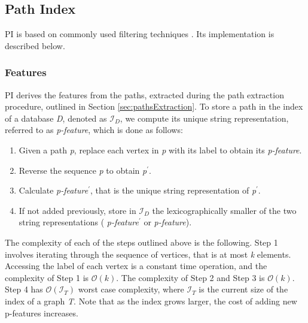 \documentclass{l4proj}
\newcommand{\fancyI}{\mathcal{I}}
\begin{document}
\subsection{Path Index}
\label{sec:pi}
PI is based on commonly used filtering techniques \cite{graphgrepsx}. Its implementation is described below.

\subsubsection{Features}
\label{sec:pifeatures}
PI derives the features from the paths, extracted during the path extraction procedure, outlined in Section \ref{sec:pathsExtraction}. To store a path in the index of a database \emph{D}, denoted as $\fancyI_{D}$, we compute its unique string representation, referred to as \emph{p-feature}, which is done as follows:

\begin{enumerate}
\item Given a path \emph{p}, replace each vertex in \emph{p} with its label to obtain its \emph{p-feature}.
\item Reverse the sequence \emph{p} to obtain \emph{p}$^{\prime}$.
\item Calculate \emph{p-feature}$^{\prime}$, that is the unique string representation of \emph{p}$^{\prime}$.
\item If not added previously, store in $\fancyI_{D}$ the lexicographically smaller of the two string representations ( \emph{p-feature}$^{\prime}$ or \emph{p-feature}).
\end{enumerate}

The complexity of each of the steps outlined above is the following. Step 1 involves iterating through the sequence of vertices, that is at most \emph{k} elements. Accessing the label of each vertex is a constant time operation, and the complexity of Step 1 is $\mathcal{O}(k)$. The complexity of Step 2 and Step 3 is $\mathcal{O}(k)$. Step 4 has $\mathcal{O}(\fancyI_{T})$ worst case complexity, where $\fancyI_{T}$ is the current size of the index of a graph \emph{T}. Note that as the index grows larger, the cost of adding new p-features increases.
\end{document}
